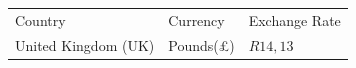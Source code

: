 \begin{enumerate}[noitemsep, label=\textbf{\arabic*}. ]
{{          }{ %
        
    
        \begin{center}
      
      \label{m39335*id68755}
      
    \noindent
      \tablelasttail{}
      \begin{xtabular}[t]{|l|l|l|}\hline
    
    
        Country &
    
    
        Currency &
    
    
        Exchange Rate%
     \tabularnewline{}
    
    
        United Kingdom (UK) &
    
    
        Pounds(£) &
    
    
        \begin{math}R14,13\end{math}%
     \tabularnewline{}
    

\end{xtabular}
\end{center}}}
\end{enumerate}
